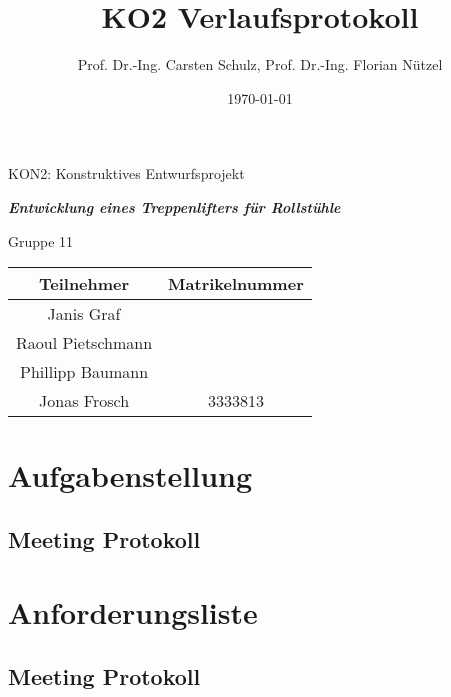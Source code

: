 \documentclass[10pt,a4paper]{article}
\author{{\LARGE Prof. Dr.-Ing. Carsten Schulz, Prof. Dr.-Ing. Florian Nützel}}
\title{\textbf{{\Huge KO2 Verlaufsprotokoll}}}
\date{{\Large \today}}
\begin{document}
\maketitle
\begin{center}

    \Large KON2: Konstruktives Entwurfsprojekt

    \vspace{1cm}

    \textbf{\textit{Entwicklung eines Treppenlifters für Rollstühle}}

    \vspace{1cm}

    {\Large Gruppe 11}
\end{center}

\begin{table}[b]
    \centering
    \begin{tabular}{|c|c|}
        \hline
        \textbf{Teilnehmer} & \textbf{Matrikelnummer} \\
        \hline
        Janis Graf          &                         \\
        \hline
        Raoul Pietschmann   &                         \\
        \hline
        Phillipp Baumann    &                         \\
        \hline
        Jonas Frosch        & 3333813                 \\
        \hline
    \end{tabular}
\end{table}

\newpage
\tableofcontents
\newpage

\section{Aufgabenstellung}
\subsection{Meeting Protokoll}
\section{Anforderungsliste}
\subsection{Meeting Protokoll}
\end{document}
